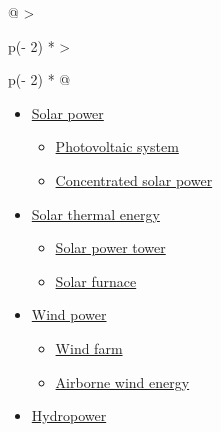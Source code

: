 \documentclass[
]{article}
\providecommand{\tightlist}{%
  \setlength{\itemsep}{0pt}\setlength{\parskip}{0pt}}
\newenvironment{LTR}{\beginL}{\endL}
\begin{document}
\begin{LTR}
\begin{otherlanguage}{english}
\begin{longtable}[]{@{}
  >{\raggedright\arraybackslash}p{(\columnwidth - 2\tabcolsep) * }
  >{\raggedright\arraybackslash}p{(\columnwidth - 2\tabcolsep) * }@{}}
\begin{minipage}[t]{\linewidth}
\begin{itemize}
  \begin{itemize}
  \tightlist
  \item
    \href{/wiki/Nuclear_power_plant}{Nuclear power plant}
  \item
    \href{/wiki/Radioisotope_thermoelectric_generator}{Radioisotope
    thermoelectric generator}
  \end{itemize}
\item
  \href{/wiki/Solar_power}{Solar power}

  \begin{itemize}
  \tightlist
  \item
    \href{/wiki/Photovoltaic_system}{Photovoltaic system}
  \item
    \href{/wiki/Concentrated_solar_power}{Concentrated solar power}
  \end{itemize}
\item
  \href{/wiki/Solar_thermal_energy}{Solar thermal energy}

  \begin{itemize}
  \tightlist
  \item
    \href{/wiki/Solar_power_tower}{Solar power tower}
  \item
    \href{/wiki/Solar_furnace}{Solar furnace}
  \end{itemize}
\item
  \href{/wiki/Wind_power}{Wind power}

  \begin{itemize}
  \tightlist
  \item
    \href{/wiki/Wind_farm}{Wind farm}
  \item
    \href{/wiki/Airborne_wind_energy}{Airborne wind energy}
  \end{itemize}
\item
  \href{/wiki/Hydropower}{Hydropower}


\end{itemize}
\end{minipage}
\end{longtable}
\end{otherlanguage}
\end{LTR}
\end{document}
